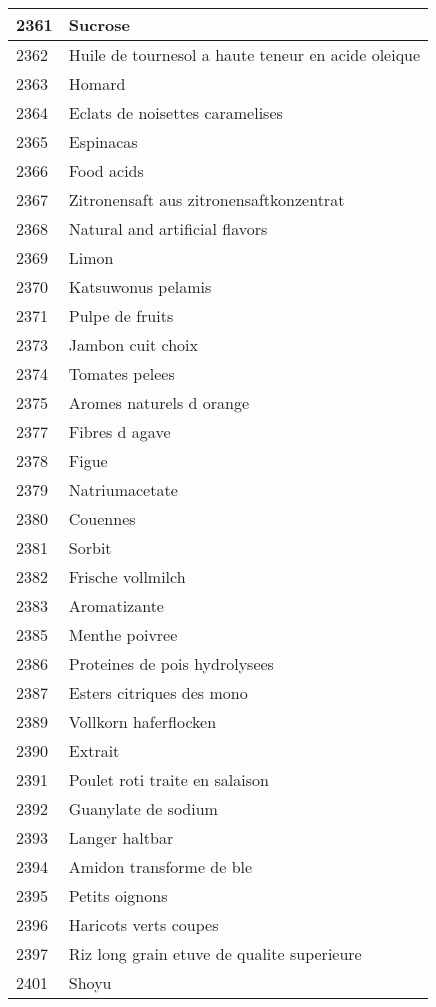 \begin{longtable}{|l|l|}
2361 & Sucrose \\ \hline 
2362 & Huile de tournesol a haute teneur en acide oleique \\ \hline 
2363 & Homard \\ \hline 
2364 & Eclats de noisettes caramelises \\ \hline 
2365 & Espinacas \\ \hline 
2366 & Food acids \\ \hline 
2367 & Zitronensaft aus zitronensaftkonzentrat \\ \hline 
2368 & Natural and artificial flavors \\ \hline 
2369 & Limon \\ \hline 
2370 & Katsuwonus pelamis \\ \hline 
2371 & Pulpe de fruits \\ \hline 
2373 & Jambon cuit choix \\ \hline 
2374 & Tomates pelees \\ \hline 
2375 & Aromes naturels d orange \\ \hline 
2377 & Fibres d agave \\ \hline 
2378 & Figue \\ \hline 
2379 & Natriumacetate \\ \hline 
2380 & Couennes \\ \hline 
2381 & Sorbit \\ \hline 
2382 & Frische vollmilch \\ \hline 
2383 & Aromatizante \\ \hline 
2385 & Menthe poivree \\ \hline 
2386 & Proteines de pois hydrolysees \\ \hline 
2387 & Esters citriques des mono \\ \hline 
2389 & Vollkorn haferflocken \\ \hline 
2390 & Extrait \\ \hline 
2391 & Poulet roti traite en salaison \\ \hline 
2392 & Guanylate de sodium \\ \hline 
2393 & Langer haltbar \\ \hline 
2394 & Amidon transforme de ble \\ \hline 
2395 & Petits oignons \\ \hline 
2396 & Haricots verts coupes \\ \hline 
2397 & Riz long grain etuve de qualite superieure \\ \hline 
2401 & Shoyu \\ \hline 

\end{longtable}
